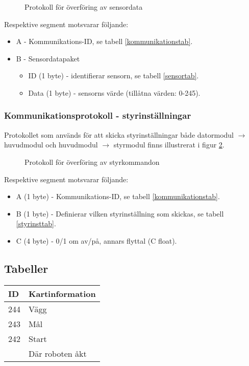 \documentclass[11pt]{article}
\begin{document}
\begin{flushleft}
 \begin{figure}[H]
\centering
\noindent\resizebox{.8\linewidth}{!}{
	}
	\caption{Protokoll för överföring av sensordata\label{sensordata}}	
\end{figure} 

Respektive segment motsvarar följande: 
\begin{itemize}
	\item A - Kommunikations-ID, se tabell \ref{kommunikationstab}.
	\item B - Sensordatapaket
	\begin{itemize}
	\item ID (1 byte) - identifierar sensorn, se tabell \ref{sensortab}.
	\item Data (1 byte) - sensorns värde (tillåtna värden: 0-245).
	\end{itemize}
\end{itemize}

\subsubsection{Kommunikationsprotokoll - styrinställningar}
Protokollet som används för att skicka styrinställningar både datormodul $\rightarrow$ huvudmodul och huvudmodul $\rightarrow$ styrmodul finns illustrerat i figur \ref{styrkomm}.

\begin{figure}[htbp]
\centering
\noindent\resizebox{.8\linewidth}{!}{
	}
	\caption{Protokoll för överföring av styrkommandon\label{styrkomm}}	
\end{figure}

Respektive segment motsvarar följande: 
\begin{itemize}
	\item A (1 byte) - Kommunikations-ID, se tabell \ref{kommunikationstab}.
	\item B (1 byte) - Definierar vilken styrinställning som skickas, se tabell \ref{styrinsttab}.
	\item C (4 byte) - 0/1 om av/på, annars flyttal (C float).
\end{itemize}

\subsection{Tabeller}

\begin{longtable}[l]{| l | l |} \hline
\textbf{ID} & \textbf{Kartinformation} \\ \hline 
244 & Vägg \\ \hline
243 & Mål \\ \hline
242 & Start \\ \hline
[0,225] & Där roboten åkt \\ \hline


\end{longtable}
\end{flushleft}
\end{document}
